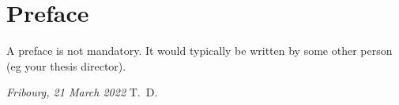 \chapter*{Preface}
A preface is not mandatory. It would typically be written by some other person (eg your thesis director).

\lipsum[1]

\bigskip
 
\noindent\textit{Fribourg, 21 March 2022}
\hfill T.~D.
